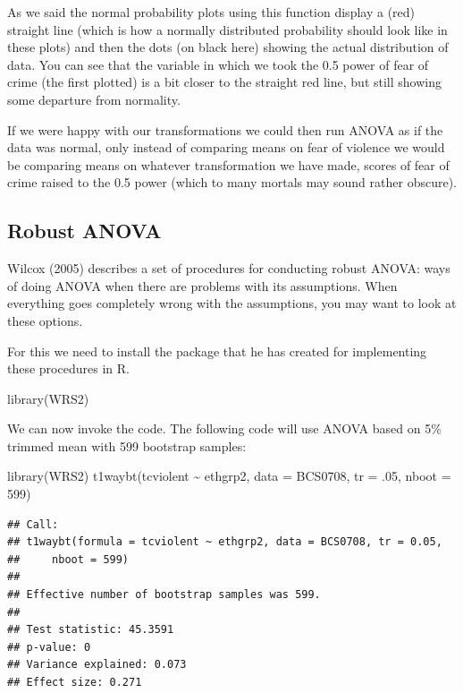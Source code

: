 \documentclass[
]{book}
\newenvironment{Shaded}{\begin{snugshade}}{\end{snugshade}}
\newcommand{\AttributeTok}[1]{\textcolor[rgb]{0.77,0.63,0.00}{#1}}
\newcommand{\DecValTok}[1]{\textcolor[rgb]{0.00,0.00,0.81}{#1}}
\newcommand{\FunctionTok}[1]{\textcolor[rgb]{0.00,0.00,0.00}{#1}}
\newcommand{\NormalTok}[1]{#1}
\newcommand{\SpecialCharTok}[1]{\textcolor[rgb]{0.00,0.00,0.00}{#1}}
\begin{document}
As we said the normal probability plots using this function display a (red) straight line (which is how a normally distributed probability should look like in these plots) and then the dots (on black here) showing the actual distribution of data. You can see that the variable in which we took the 0.5 power of fear of crime (the first plotted) is a bit closer to the straight red line, but still showing some departure from normality.

If we were happy with our transformations we could then run ANOVA as if the data was normal, only instead of comparing means on fear of violence we would be comparing means on whatever transformation we have made, scores of fear of crime raised to the 0.5 power (which to many mortals may sound rather obscure).

\hypertarget{robust-anova}{%
\subsection{Robust ANOVA}\label{robust-anova}}

Wilcox (2005) describes a set of procedures for conducting robust ANOVA: ways of doing ANOVA when there are problems with its assumptions. When everything goes completely wrong with the assumptions, you may want to look at these options.

For this we need to install the package that he has created for implementing these procedures in R.

\begin{Shaded}
\begin{Highlighting}[]
\FunctionTok{library}\NormalTok{(WRS2) }
\end{Highlighting}
\end{Shaded}

We can now invoke the code. The following code will use ANOVA based on 5\% trimmed mean with 599 bootstrap samples:

\begin{Shaded}
\begin{Highlighting}[]
\FunctionTok{library}\NormalTok{(WRS2)}
\FunctionTok{t1waybt}\NormalTok{(tcviolent }\SpecialCharTok{\textasciitilde{}}\NormalTok{ ethgrp2, }\AttributeTok{data =}\NormalTok{ BCS0708, }\AttributeTok{tr =}\NormalTok{ .}\DecValTok{05}\NormalTok{, }\AttributeTok{nboot =} \DecValTok{599}\NormalTok{)}
\end{Highlighting}
\end{Shaded}

\begin{verbatim}
## Call:
## t1waybt(formula = tcviolent ~ ethgrp2, data = BCS0708, tr = 0.05, 
##     nboot = 599)
## 
## Effective number of bootstrap samples was 599.
## 
## Test statistic: 45.3591 
## p-value: 0 
## Variance explained: 0.073 
## Effect size: 0.271
\end{verbatim}
\end{document}
